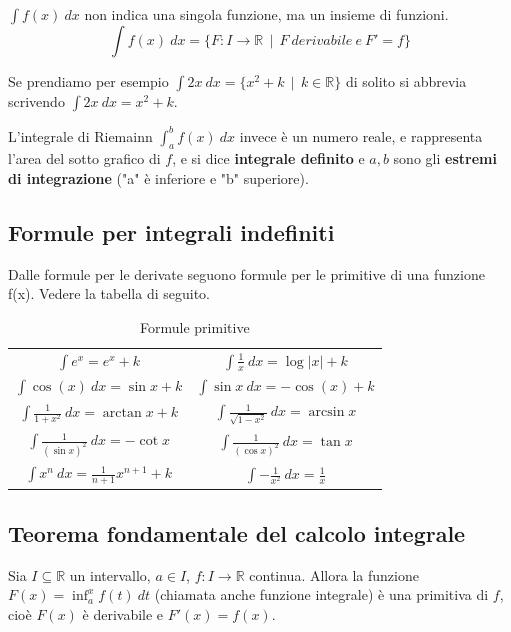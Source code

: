 \begin{observation}
$\int f(x)\:dx$ non indica una singola funzione, ma un insieme di funzioni.
\[\int f(x)\:dx = \{F: I \to \mathbb{R} \:\: | \:\: F \: derivabile \: e \: F'=f\}\]
\end{observation}

\begin{example}
Se prendiamo per esempio $\int 2x\:dx = \{x^2 + k \:\:|\:\: k \in \mathbb{R}\}$ di solito si abbrevia scrivendo $\int 2x\:dx = x^2 + k$. 
\end{example}

\hspace{-15pt}L'integrale di Riemainn $\int_a^b f(x)\:dx$ invece è un numero reale, e rappresenta l'area del sotto grafico di $f$, e si dice \textbf{integrale definito} e $a,b$ sono gli \textbf{estremi di integrazione} ("a" è inferiore e "b" superiore). 

\subsection{Formule per integrali indefiniti}
Dalle formule per le derivate seguono formule per le primitive di una funzione f(x). Vedere la tabella di seguito.
\begin{table}[h!]
    \centering
    \setlength{\tabcolsep}{6pt}
    \renewcommand{\arraystretch}{1.5}
    \begin{tabular}{|c||c|}
        \hline
        $\int e^x=e^x + k$ & $\int \frac{1}{x}\:dx=\log|x| + k$\\
        
        $\int \cos(x)\:dx=\sin{x} + k$ & $\int \sin{x}\:dx=-\cos(x) + k$ \\
        
        $\int \frac{1}{1+x^2}\:dx=\arctan{x} + k$ & $\int \frac{1}{\sqrt{1 - x^2}}\:dx=\arcsin{x}$\\
        
        $\int \frac{1}{(\sin{x})^2}\:dx=-\cot{x}$ & $\int \frac{1}{(\cos{x})^2}\:dx=\tan{x}$ \\
        
        $\int x^n \:dx=\frac{1}{n+1}x^{n+1} + k$ & $\int -\frac{1}{x^2}\:dx=\frac{1}{x}$\\
        \hline
    \end{tabular}
    \caption{Formule primitive}
\end{table}
\vspace{-10pt}
\subsection{Teorema fondamentale del calcolo integrale}
\begin{theorem}
Sia $I \subseteq \mathbb{R}$ un intervallo, $a \in I$, $f: I \to \mathbb{R}$ continua. Allora la funzione $F(x) = \inf_a^x f(t) \:dt$ (chiamata anche funzione integrale) è una primitiva di $f$, cioè $F(x)$ è derivabile e $F'(x) = f(x)$.
\end{theorem}

